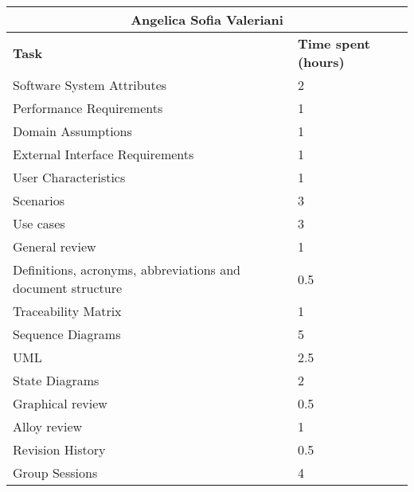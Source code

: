 \begin{table}[H]
  \center
  \begin{tabular}{l|l}
    \multicolumn{2}{c}{\textbf{Angelica Sofia Valeriani}} \\
    \hline
    \textbf{Task} & \textbf{Time spent (hours)}\\
    \hline
    Software System Attributes & 2 \\
    Performance Requirements & 1 \\
    Domain Assumptions & 1 \\
    External Interface Requirements & 1 \\
    User Characteristics & 1 \\
    Scenarios & 3 \\
    Use cases & 3 \\
    General review & 1 \\
    Definitions, acronyms, abbreviations and document structure & 0.5 \\
    Traceability Matrix & 1 \\
    Sequence Diagrams & 5 \\
    UML & 2.5 \\
    State Diagrams & 2 \\
    Graphical review & 0.5 \\
    Alloy review & 1 \\
    Revision History & 0.5 \\
    Group Sessions & 4 \\
  \end{tabular}
\end{table}